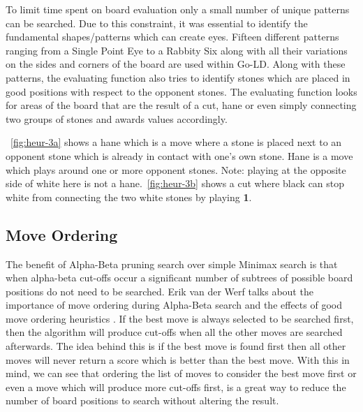 \documentclass{l4proj}
\newcommand{\bo}[1]{\textbf{#1}}
\begin{document}
To limit time spent on board evaluation only a small number of unique patterns can be searched. Due to this constraint, it was essential to identify the fundamental shapes/patterns which can create eyes. Fifteen different patterns ranging from a Single Point Eye to a Rabbity Six along with all their variations on the sides and corners of the board are used within Go-LD.  Along with these patterns, the evaluating function also tries to identify stones which are placed in good positions with respect to the opponent stones. The evaluating function looks for areas of the board that are the result of a cut, hane or even simply connecting two groups of stones and awards values accordingly.


~\autoref{fig:heur-3a} shows a hane which is a move where a stone is placed next to an opponent stone which is already in contact with one’s own stone. Hane is a move which plays around one or more opponent stones. Note: playing at the opposite side of white here is not a hane.~\autoref{fig:heur-3b} shows a cut where black can stop white from connecting the two white stones by playing \bo{1}.





\subsection{Move Ordering}
The benefit of Alpha-Beta pruning search over simple Minimax search is that when alpha-beta cut-offs occur a significant number of subtrees of possible board positions do not need to be searched. Erik van der Werf talks about the importance of move ordering during Alpha-Beta search and the effects of good move ordering heuristics \citep{ErikvanderWerf2004}. If the best move is always selected to be searched first, then the algorithm will produce cut-offs when all the other moves are searched afterwards. The idea behind this is if the best move is found first then all other moves will never return a score which is better than the best move. With this in mind, we can see that ordering the list of moves to consider the best move first or even a move which will produce more cut-offs first, is a great way to reduce the number of board positions to search without altering the result.
\end{document}
